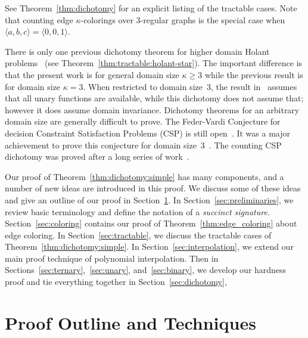 \documentclass[11pt]{article}
\begin{document}
\noindent
See Theorem~\ref{thm:dichotomy} for an explicit listing of the tractable cases.
Note that counting edge $\kappa$-colorings over $3$-regular graphs is the special case when $\langle a,b,c \rangle = \langle 0,0,1 \rangle$.

There is only one previous dichotomy theorem for higher domain Holant problems~\cite{CLX13} (see Theorem~\ref{thm:tractable:holant-star}).
The important difference is that the present work is for general domain size $\kappa \ge 3$ while the previous result is for domain size $\kappa = 3$.
When restricted to domain size~$3$,
the result in~\cite{CLX13} assumes that all unary functions are available,
while this dichotomy does not assume that; however it does assume domain invariance.
Dichotomy theorems for an arbitrary domain size are generally difficult to prove.
The Feder-Vardi Conjecture for decision Constraint Satisfaction Problems (CSP) is still open~\cite{FV99}.
It was a major achievement to prove this conjecture for domain size~$3$~\cite{Bul06}.
The counting CSP dichotomy was proved after a long series of work~\cite{BD07, Bul08, BG05, DGJ09, BDGJR09, CLX09a, CCL11, CHL12, DR10, GHLX11, CK12, CC12}.

Our proof of Theorem~\ref{thm:dichotomy:simple} has many components,
and a number of new ideas are introduced in this proof.
We discuss some of these ideas and give an outline of our proof in Section~\ref{sec:outline}.
In Section~\ref{sec:preliminaries},
we review basic terminology and define the notation of a \emph{succinct signature}.
Section~\ref{sec:coloring} contains our proof of Theorem~\ref{thm:edge_coloring} about edge coloring.
In Section~\ref{sec:tractable},
we discuss the tractable cases of Theorem~\ref{thm:dichotomy:simple}.
In Section~\ref{sec:interpolation},
we extend our main proof technique of polynomial interpolation.
Then in Sections~\ref{sec:ternary},~\ref{sec:unary}, and~\ref{sec:binary},
we develop our hardness proof
and tie everything together in Section~\ref{sec:dichotomy},

\section{Proof Outline and Techniques} \label{sec:outline}
\end{document}
